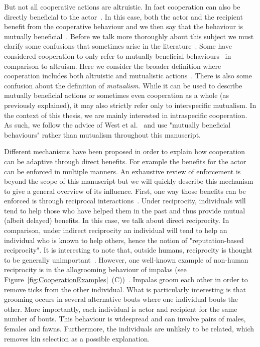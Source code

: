     But not all cooperative actions are altruistic. In fact cooperation can also be directly beneficial to the actor~\parencite{Leimar2010}. In this case, both the actor and the recipient benefit from the cooperative behaviour and we then say that the behaviour is mutually beneficial~\parencite{West2007a}. Before we talk more thoroughly about this subject we must clarify some confusions that sometimes arise in the literature~\parencite{Bergmuller2007a}. Some have considered cooperation to only refer to mutually beneficial behaviours~\parencite{Trivers1985, Lehmann2006} in comparison to altruism. Here we consider the broader definition where cooperation includes both altruistic and mutualistic actions~\parencite{West2007a}. There is also some confusion about the definition of \emph{mutualism}. While it can be used to describe mutually beneficial actions or sometimes even cooperation as a whole (as previously explained), it may also strictly refer only to interspecific mutualism. In the context of this thesis, we are mainly interested in intraspecific cooperation. As such, we follow the advice of West et al.~\parencite{West2007} and use "mutually beneficial behaviours" rather than mutualism throughout this manuscript.


    Different mechanisms have been proposed in order to explain how cooperation can be adaptive through direct benefits. For example the benefits for the actor can be enforced in multiple manners. An exhaustive review of enforcement is beyond the scope of this manuscript but we will quickly describe this mechanism to give a general overview of its influence. First, one way those benefits can be enforced is through reciprocal interactions~\parencite{Trivers1971}. Under reciprocity, individuals will tend to help those who have helped them in the past and thus provide mutual (albeit delayed) benefits. In this case, we talk about direct reciprocity. In comparison, under indirect reciprocity an individual will tend to help an individual who is known to help others, hence the notion of "reputation-based reciprocity". It is interesting to note that, outside humans, reciprocity is thought to be generally unimportant~\parencite{Dugatkin1997}. However, one well-known example of non-human reciprocity is in the allogrooming behaviour of impalas (see Figure~\ref{fig:CooperationExamples}~(C))~\parencite{Hart1992}. Impalas groom each other in order to remove ticks from the other individual. What is particularly interesting is that grooming occurs in several alternative bouts where one individual bouts the other. More importantly, each individual is actor and recipient for the same number of bouts. This behaviour is widespread and can involve pairs of males, females and fawns. Furthermore, the individuals are unlikely to be related, which removes kin selection as a possible explanation.

